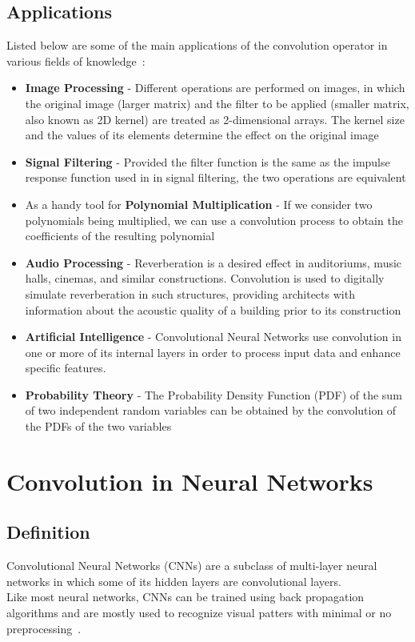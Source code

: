 \subsection{Applications}
\label{sec:convolution:mathematics:applications}
Listed below are some of the main applications of the convolution operator in various fields of knowledge~\citep{Srivastava2013}:
\begin{itemize}
	\item \textbf{Image Processing} - Different operations are performed on images, in which the original image (larger matrix) and the filter to be applied (smaller matrix, also known as 2D kernel) are treated as 2-dimensional arrays. The kernel size and the values of its elements determine the effect on the original image
    \item \textbf{Signal Filtering} - Provided the filter function is the same as the impulse response function used in in signal filtering, the two operations are equivalent
    \item As a handy tool for \textbf{Polynomial Multiplication} - If we consider two polynomials being multiplied, we can use a convolution process to obtain the coefficients of the resulting polynomial
    \item \textbf{Audio Processing} - Reverberation is a desired effect in auditoriums, music halls, cinemas, and similar constructions. Convolution is used to digitally simulate reverberation in such structures, providing architects with information about the acoustic quality of a building prior to its construction
    \item \textbf{Artificial Intelligence} - Convolutional Neural Networks use convolution in one or more of its internal layers in order to process input data and enhance specific features.
    \item \textbf{Probability Theory} - The Probability Density Function (PDF) of the sum of two independent random variables can be obtained by the convolution of the PDFs of the two variables
\end{itemize}
\section{Convolution in Neural Networks}
\label{sec:convolution:convolutionalneuralnetworks}
\subsection{Definition}
\label{sec:convolution:convolutionalneuralnetworks:definition}
Convolutional Neural Networks (CNNs) are a subclass of multi-layer neural networks in which some of its hidden layers are convolutional layers.\\
Like most neural networks, CNNs can be trained using back propagation algorithms and are mostly used to recognize visual patters with minimal or no preprocessing~\citep{Lawrence1997A}.\\
